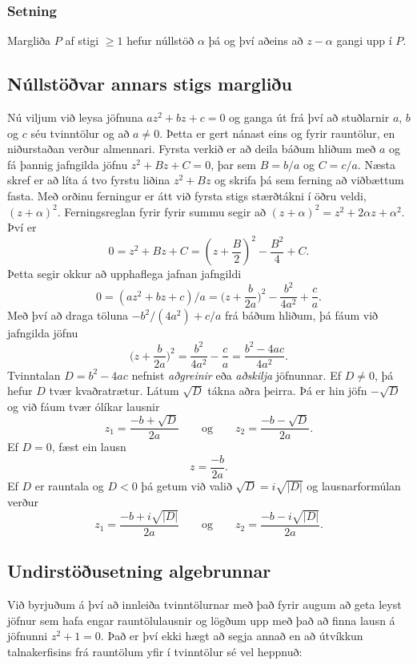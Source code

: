 \subsubsection{Setning}  Margliða $P$ af stigi $\geq 1$ hefur núllstöð $\alpha$
þá og því aðeins að $z-\alpha$ gangi upp í $P$.



\subsection*{Núllstöðvar annars stigs margliðu}

Nú viljum við leysa jöfnuna  $az^2+bz+c=0$ og ganga út frá því 
að  stuðlarnir $a$, $b$ og $c$ séu tvinntölur og að $a\neq 0$.
Þetta er gert nánast eins og fyrir rauntölur, en niðurstaðan verður
almennari. 
Fyrsta verkið er að deila báðum hliðum með $a$ og fá þannig jafngilda
jöfnu  $z^2+Bz+C=0$, þar sem $B=b/a$ og $C=c/a$.  Næsta skref er að
líta á tvo fyrstu liðina $z^2+Bz$ og skrifa þá sem ferning að viðbættum
fasta.  Með orðinu ferningur er átt við fyrsta stigs stærðtákni
í öðru veldi, $(z+\alpha)^2$.  Ferningsreglan fyrir fyrir summu segir
að $(z+\alpha)^2=z^2+2\alpha z+\alpha^2$.  Því er 
$$
0=z^2+Bz+C=(z+\dfrac B2)^2-\dfrac {B^2}4+C.
$$
Þetta segir okkur að upphaflega jafnan jafngildi
$$
0=(az^2+bz+c)/a=\bigg(z+\dfrac {b}{2a}\bigg)^2-\dfrac{b^2}{4a^2}+\dfrac ca.
$$
Með því að draga töluna $-b^2/(4a^2)+c/a$ frá báðum hliðum, þá fáum við
jafngilda jöfnu
$$
\bigg(z+\dfrac {b}{2a}\bigg)^2=\dfrac{b^2}{4a^2}-\dfrac ca=\dfrac{b^2-4ac}{4a^2}.
$$
Tvinntalan  $D=b^2-4ac$ nefnist {\it aðgreinir} eða {\it aðskilja }
jöfnunnar. Ef $D\neq 0$, þá hefur $D$ tvær kvaðratrætur.  
Látum $\sqrt D$ tákna aðra þeirra.  Þá er hin jöfn
$-\sqrt D$ og við fáum tvær ólíkar lausnir 
$$
z_1=\dfrac{-b+\sqrt D}{2a} \qquad\text {og} \qquad
z_2=\dfrac{-b-\sqrt D}{2a}.
$$
Ef $D=0$, fæst ein lausn
$$
z=\dfrac{-b}{2a}.
$$
Ef $D$ er rauntala og $D<0$ þá getum við valið $\sqrt D=i\sqrt{|D|}$
og lausnarformúlan verður
$$
z_1=\dfrac{-b+i\sqrt{ |D|}}{2a} \qquad\text {og} \qquad
z_2=\dfrac{-b-i\sqrt{|D|}}{2a}.
$$

\subsection*{Undirstöðusetning algebrunnar}

Við byrjuðum á því að innleiða tvinntölurnar með það fyrir augum að
geta leyst jöfnur sem hafa engar rauntölulausnir og lögðum upp með það
að finna lausn á jöfnunni $z^2+1=0$.  Það er því ekki hægt að
segja annað en að útvíkkun talnakerfisins frá rauntölum yfir í
tvinntölur sé vel heppnuð:
 
